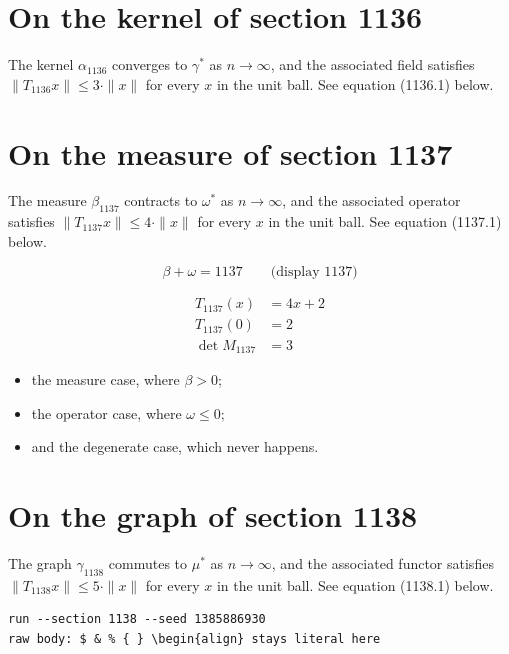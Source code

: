 \documentclass{article}
\begin{document}
\section{On the kernel of section 1136}
The kernel $\alpha_{1136}$ converges to $\gamma^{*}$ as $n \to \infty$,
and the associated field satisfies $\|T_{1136} x\| \leq 3 \cdot \|x\|$
for every $x$ in the unit ball. See equation (1136.1) below.

\section{On the measure of section 1137}
The measure $\beta_{1137}$ contracts to $\omega^{*}$ as $n \to \infty$,
and the associated operator satisfies $\|T_{1137} x\| \leq 4 \cdot \|x\|$
for every $x$ in the unit ball. See equation (1137.1) below.

$$
\beta + \omega = 1137 \qquad \text{(display 1137)}
$$

\begin{align}
T_{1137}(x) &= 4 x + 2 \\
T_{1137}(0) &= 2 \\
\det M_{1137} &= 3
\end{align}

\begin{itemize}
  \item the measure case, where $\beta > 0$;
  \item the operator case, where $\omega \leq 0$;
  \item and the degenerate case, which never happens.
\end{itemize}

\section{On the graph of section 1138}
The graph $\gamma_{1138}$ commutes to $\mu^{*}$ as $n \to \infty$,
and the associated functor satisfies $\|T_{1138} x\| \leq 5 \cdot \|x\|$
for every $x$ in the unit ball. See equation (1138.1) below.

\begin{verbatim}
run --section 1138 --seed 1385886930
raw body: $ & % { } \begin{align} stays literal here
\end{verbatim}
\end{document}
